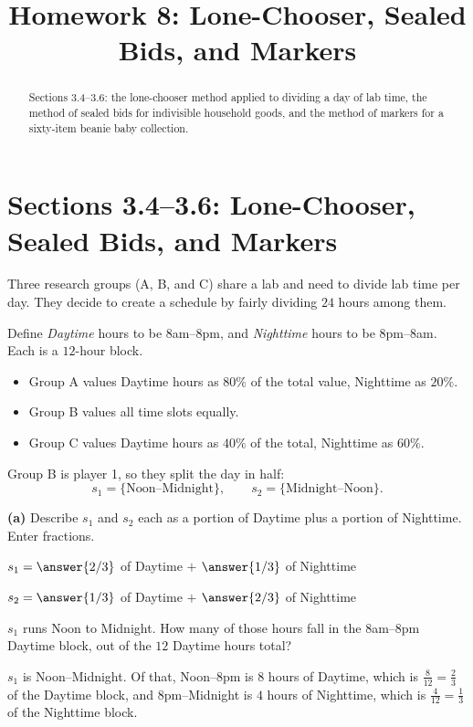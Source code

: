 \documentclass[12pt]{ximera}
\title{Homework 8: Lone-Chooser, Sealed Bids, and Markers}
\begin{document}
\begin{abstract}
Sections 3.4--3.6: the lone-chooser method applied to dividing a day of lab time, the
method of sealed bids for indivisible household goods, and the method of markers for a
sixty-item beanie baby collection.
\end{abstract}
\maketitle

\section*{Sections 3.4--3.6: Lone-Chooser, Sealed Bids, and Markers}

\begin{problem}
Three research groups (A, B, and C) share a lab and need to divide lab time per day.
They decide to create a schedule by fairly dividing $24$ hours among them.

Define \emph{Daytime} hours to be 8am--8pm, and \emph{Nighttime} hours to be
8pm--8am. Each is a $12$-hour block.
\begin{itemize}
\item Group A values Daytime hours as $80\%$ of the total value, Nighttime as $20\%$.
\item Group B values all time slots equally.
\item Group C values Daytime hours as $40\%$ of the total, Nighttime as $60\%$.
\end{itemize}

Group B is player 1, so they split the day in half:
\[ s_1 = \{\text{Noon--Midnight}\}, \qquad s_2 = \{\text{Midnight--Noon}\}. \]

\begin{prompt}
\textbf{(a)} Describe $s_1$ and $s_2$ each as a portion of Daytime plus a portion of
Nighttime. Enter fractions.

$s_1 = \answer{2/3}$ of Daytime $+$ $\answer{1/3}$ of Nighttime

\smallskip
$s_2 = \answer{1/3}$ of Daytime $+$ $\answer{2/3}$ of Nighttime

\begin{hint}
$s_1$ runs Noon to Midnight. How many of those hours fall in the 8am--8pm Daytime
block, out of the $12$ Daytime hours total?
\end{hint}

\begin{feedback}
$s_1$ is Noon--Midnight. Of that, Noon--8pm is $8$ hours of Daytime, which is
$\frac{8}{12}=\frac23$ of the Daytime block, and 8pm--Midnight is $4$ hours of
Nighttime, which is $\frac{4}{12}=\frac13$ of the Nighttime block.


\end{feedback}
\end{prompt}
\end{problem}
\end{document}
